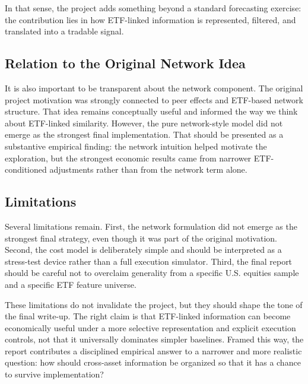 In that sense, the project adds something beyond a standard forecasting exercise: the contribution lies in how ETF-linked information is represented, filtered, and translated into a tradable signal.

\subsection{Relation to the Original Network Idea}

It is also important to be transparent about the network component. The original project motivation was strongly connected to peer effects and ETF-based network structure. That idea remains conceptually useful and informed the way we think about ETF-linked similarity. However, the pure network-style model did not emerge as the strongest final implementation. That should be presented as a substantive empirical finding: the network intuition helped motivate the exploration, but the strongest economic results came from narrower ETF-conditioned adjustments rather than from the network term alone.

\subsection{Limitations}

Several limitations remain. First, the network formulation did not emerge as the strongest final strategy, even though it was part of the original motivation. Second, the cost model is deliberately simple and should be interpreted as a stress-test device rather than a full execution simulator. Third, the final report should be careful not to overclaim generality from a specific U.S. equities sample and a specific ETF feature universe.

These limitations do not invalidate the project, but they should shape the tone of the final write-up. The right claim is that ETF-linked information can become economically useful under a more selective representation and explicit execution controls, not that it universally dominates simpler baselines. Framed this way, the report contributes a disciplined empirical answer to a narrower and more realistic question: how should cross-asset information be organized so that it has a chance to survive implementation?
